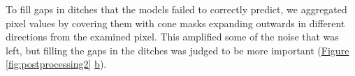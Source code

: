 \documentclass[]{interact}
\theoremstyle{plain}%
\theoremstyle{definition}
\theoremstyle{remark}
\begin{document}
To fill gaps in ditches that the models failed to correctly predict, we aggregated pixel values by covering them with cone masks expanding outwards in different directions from the examined pixel. This amplified some of the noise that was left, but filling the gaps in the ditches was judged to be more important (\hyperref[fig:postprocessing2]{Figure} \ref{fig:postprocessing2} \hyperref[fig:postprocessing2]{b}).

\begin{figure} [!htb]
    \centering
    \hspace{5pt}
    \subfigure[]{
}
\end{figure}
\end{document}
